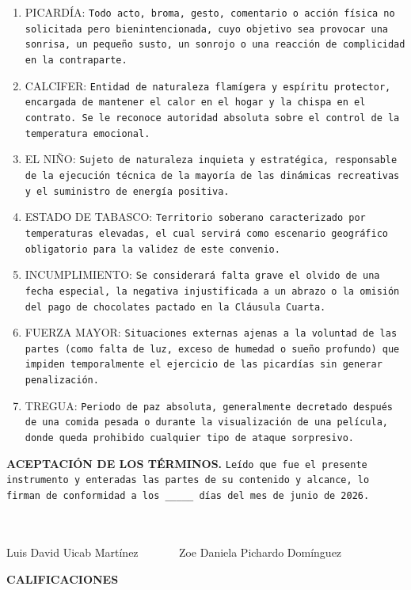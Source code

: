 \documentclass[11pt]{scrartcl}
\begin{document}
\begin{enumerate}[*]
    \item PICARDÍA: \texttt{Todo acto, broma, gesto, comentario o acción física no solicitada pero bienintencionada, cuyo objetivo sea provocar una sonrisa, un pequeño susto, un sonrojo o una reacción de complicidad en la contraparte.}
    \item CALCIFER: \texttt{Entidad de naturaleza flamígera y espíritu protector, encargada de mantener el calor en el hogar y la chispa en el contrato. Se le reconoce autoridad absoluta sobre el control de la temperatura emocional.}
    \item EL NIÑO: \texttt{Sujeto de naturaleza inquieta y estratégica, responsable de la ejecución técnica de la mayoría de las dinámicas recreativas y el suministro de energía positiva.}
    \item ESTADO DE TABASCO: \texttt{Territorio soberano caracterizado por temperaturas elevadas, el cual servirá como escenario geográfico obligatorio para la validez de este convenio.}
    \item INCUMPLIMIENTO: \texttt{Se considerará falta grave el olvido de una fecha especial, la negativa injustificada a un abrazo o la omisión del pago de chocolates pactado en la Cláusula Cuarta.}
    \item FUERZA MAYOR: \texttt{Situaciones externas ajenas a la voluntad de las partes (como falta de luz, exceso de humedad o sueño profundo) que impiden temporalmente el ejercicio de las picardías sin generar penalización.}
    \item TREGUA: \texttt{Periodo de paz absoluta, generalmente decretado después de una comida pesada o durante la visualización de una película, donde queda prohibido cualquier tipo de ataque sorpresivo.}
\end{enumerate}
\textbf{ACEPTACIÓN DE LOS TÉRMINOS.} \texttt{Leído que fue el presente instrumento y enteradas las partes de su contenido y alcance, lo firman de conformidad a los \_\_\_\_\_ días del mes de junio de 2026.}
\\ \\ \\
\begin{center}
    Luis David Uicab Martínez $\quad \quad \quad$ Zoe Daniela Pichardo Domínguez
\end{center}
\textbf{CALIFICACIONES}
\end{document}
